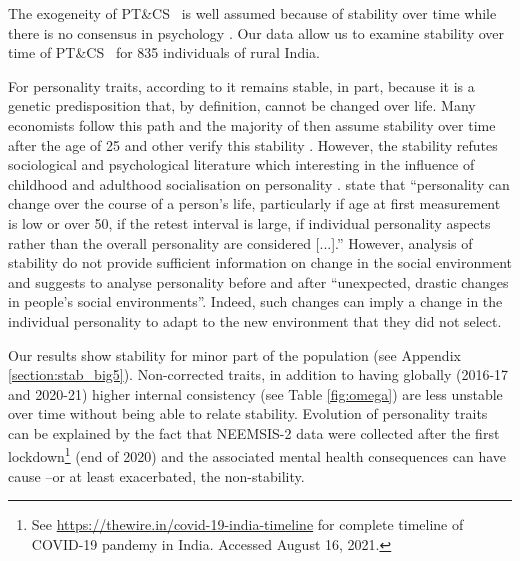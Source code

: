 \documentclass[a4paper, 12pt, onecolumn]{article}
\newcommand{\PTCS}{PT\&CS}
\begin{document}
The exogeneity of \PTCS~ is well assumed because of stability over time while there is no consensus in psychology \citep{Ardelt2000, Deary2014}.
Our data allow us to examine stability over time of \PTCS~ for 835 individuals of rural India.

For personality traits, according to \cite{Costa1997, McCrae2000} it remains stable, in part, because it is a genetic predisposition that, by definition, cannot be changed over life.
Many economists follow this path and the majority of then assume stability over time after the age of 25 and other verify this stability \citep{CobbClark2011}.
However, the stability refutes sociological and psychological literature which interesting in the influence of childhood and adulthood socialisation on personality \citep{Mortimer1978, Moen1995}.
\cite{Ardelt2000} state that ``personality can change over the course of a person's life, particularly if age at first measurement is low or over 50, if the retest interval is large, if individual personality aspects rather than the overall personality are considered [...].''
However, analysis of stability do not provide sufficient information on change in the social environment and \cite{Ardelt2000} suggests to analyse personality before and after ``unexpected, drastic changes in people's social environments''.
Indeed, such changes can imply a change in the individual personality to adapt to the new environment that they did not select.

Our results show stability for minor part of the population (see Appendix \ref{section:stab_big5}).
Non-corrected traits, in addition to having globally (2016-17 and 2020-21) higher internal consistency (see Table \ref{fig:omega}) are less unstable over time without being able to relate stability.
Evolution of personality traits can be explained by the fact that NEEMSIS-2 data were collected after the first lockdown\footnote{See \url{https://thewire.in/covid-19-india-timeline} for complete timeline of COVID-19 pandemy in India. Accessed August 16, 2021.} (end of 2020) and the associated mental health consequences \citep{Golechha2020, Kochhar2020} can have cause --or at least exacerbated, the non-stability.
\end{document}
